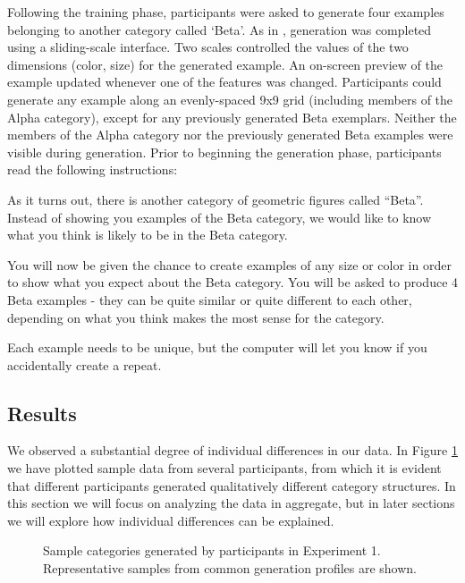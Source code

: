 \documentclass[12pt]{article}
\newcommand\inputpgf[2]{{
\let\pgfimageWithoutPath\pgfimage
\renewcommand{\pgfimage}[2][]{\pgfimageWithoutPath[##1]{#1/##2}}

}}
\begin{document}
\begin{flushleft}
Following the training phase, participants were asked to generate four examples belonging to another category called `Beta'. As in \citet{jern2013probabilistic}, generation was completed using a sliding-scale interface. Two scales controlled the values of the two dimensions (color, size)  for the generated example. An on-screen preview of the example updated whenever one of the features was changed. Participants could generate any example along an evenly-spaced 9x9 grid (including members of the Alpha category), except for any previously generated Beta exemplars. Neither the members of the Alpha category nor the previously generated Beta examples were visible during generation. Prior to beginning the generation phase, participants read the following instructions:

\begin{displayquote}
As it turns out, there is another category of geometric figures called ``Beta''. Instead of showing you examples of the Beta category, we would like to know what you think is likely to be in the Beta category. 

You will now be given the chance to create examples of any size or color in order to show what you expect about the Beta category. You will be asked to produce 4 Beta examples - they can be quite similar or quite different to each other, depending on what you think makes the most sense for the category.

Each example needs to be unique, but the computer will let you know if you accidentally create a repeat.
\end{displayquote}

\subsection{Results}

We observed a substantial degree of individual differences in our data. In Figure \ref{fig:e1-samples} we have plotted sample data from several participants, from which it is evident that different participants generated qualitatively different category structures. In this section we will focus on analyzing the data in aggregate, but in later sections we will explore how individual differences can be explained.

\begin{figure}
    \begin{center}
    \inputpgf{figs/}{e1-samples.pgf}
    \caption{Sample categories generated by participants in Experiment 1. Representative samples from common generation profiles are shown.}
    \label{fig:e1-samples}
    \end{center}
\end{figure}


\end{flushleft}
\end{document}
